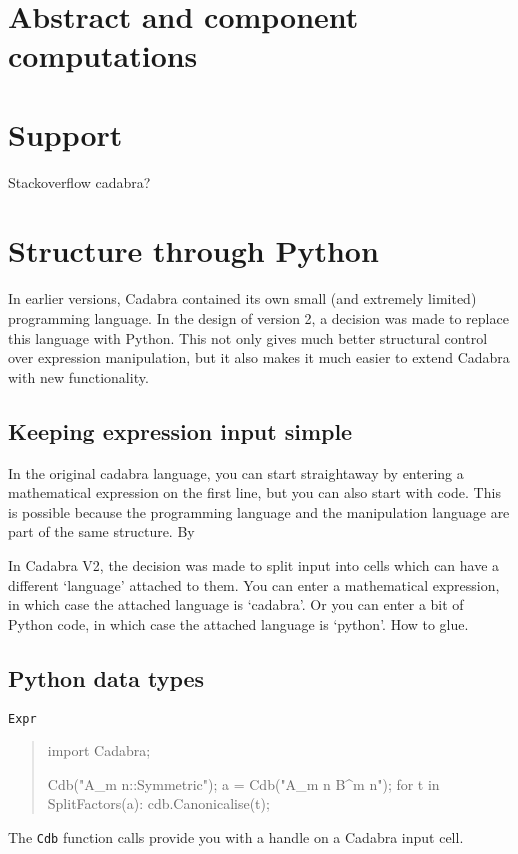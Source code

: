 \documentclass[11pt]{article}
\begin{document}
\section{Abstract and component computations}


\section{Support}

Stackoverflow cadabra?

\section{Structure through Python}

In earlier versions, Cadabra contained its own small (and extremely
limited) programming language. In the design of version 2, a decision
was made to replace this language with Python. This not only gives
much better structural control over expression manipulation, but it
also makes it much easier to extend Cadabra with new functionality.


\subsection{Keeping expression input simple}

In the original cadabra language, you can start straightaway by
entering a mathematical expression on the first line, but you can also
start with code.  This is possible because the programming language
and the manipulation language are part of the same structure. By

In Cadabra V2, the decision was made to split input into cells which
can have a different `language' attached to them. You can enter a
mathematical expression, in which case the attached language is
`cadabra'. Or you can enter a bit of Python code, in which case the
attached language is `python'. How to glue.

\subsection{Python data types}

\begin{description}
\item[{\tt Expr}] 
\end{description}


\begin{quote}
import Cadabra;


Cdb("A_{m n}::Symmetric");
a = Cdb("A_{m n} B^{m n}");
for t in SplitFactors(a):
    cdb.Canonicalise(t);

\end{quote}
The {\tt Cdb} function calls provide you with a handle on 
a Cadabra input cell. 
\end{document}
